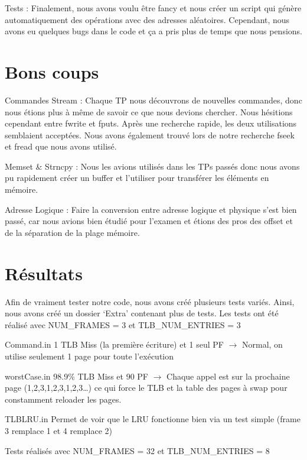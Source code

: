\documentclass{article}
\begin{document}
\par
Tests : Finalement, nous avons voulu être fancy et nous créer un script qui génère automatiquement des opérations avec des adresses aléatoires. Cependant, nous avons eu quelques bugs dans le code et ça a pris plus de temps que nous pensions. 

\section {Bons coups}
\par
Commandes Stream : Chaque TP nous découvrons de nouvelles commandes, donc nous étions plus à même de savoir ce que nous devions chercher. Nous hésitions cependant entre fwrite et fputs. Après une recherche rapide, les deux utilisations semblaient acceptées. Nous avons également trouvé lors de notre recherche fseek et fread que nous avons utilisé.


\par
Memset \& Strncpy : Nous les avions utilisés dans les TPs passés donc nous avons pu rapidement créer un buffer et l’utiliser pour transférer les éléments en mémoire.


\par
Adresse Logique : Faire la conversion entre adresse logique et physique s’est bien passé, car nous avions bien étudié pour l’examen et étions des pros des offset et de la séparation de la plage mémoire.


\par
\section{Résultats}
Afin de vraiment tester notre code, nous avons créé plusieurs tests variés. Ainsi, nous avons créé un dossier ‘Extra’ contenant plus de tests. Les tests ont été réalisé avec  NUM\_FRAMES = 3 et  TLB\_NUM\_ENTRIES = 3

Command.in
1 TLB Miss (la première écriture) et 1 seul PF $\rightarrow $ Normal, on utilise seulement 1 page pour toute l’exécution

worstCase.in
98.9\% TLB Miss et 90 PF $\rightarrow $ Chaque appel est sur la prochaine page (1,2,3,1,2,3,1,2,3…) ce qui force le TLB et la table des pages à swap pour constamment reloader les pages.

TLBLRU.in
Permet de voir que le LRU fonctionne bien via un test simple (frame 3 remplace 1 et 4 remplace 2)


Tests réalisés avec NUM\_FRAMES = 32 et   TLB\_NUM\_ENTRIES = 8
\end{document}
